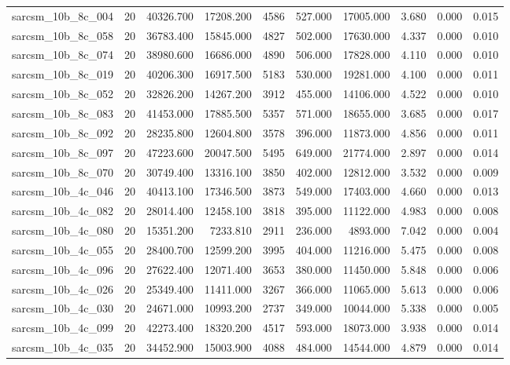 \begin{tabular}{lrrrrrrrrr}
sarcsm\_10b\_8c\_004 & 20 & 40326.700 & 17208.200 & 4586 & 527.000 & 17005.000 & 3.680 & 0.000 & 0.015 \\
sarcsm\_10b\_8c\_058 & 20 & 36783.400 & 15845.000 & 4827 & 502.000 & 17630.000 & 4.337 & 0.000 & 0.010 \\
sarcsm\_10b\_8c\_074 & 20 & 38980.600 & 16686.000 & 4890 & 506.000 & 17828.000 & 4.110 & 0.000 & 0.010 \\
sarcsm\_10b\_8c\_019 & 20 & 40206.300 & 16917.500 & 5183 & 530.000 & 19281.000 & 4.100 & 0.000 & 0.011 \\
sarcsm\_10b\_8c\_052 & 20 & 32826.200 & 14267.200 & 3912 & 455.000 & 14106.000 & 4.522 & 0.000 & 0.010 \\
sarcsm\_10b\_8c\_083 & 20 & 41453.000 & 17885.500 & 5357 & 571.000 & 18655.000 & 3.685 & 0.000 & 0.017 \\
sarcsm\_10b\_8c\_092 & 20 & 28235.800 & 12604.800 & 3578 & 396.000 & 11873.000 & 4.856 & 0.000 & 0.011 \\
sarcsm\_10b\_8c\_097 & 20 & 47223.600 & 20047.500 & 5495 & 649.000 & 21774.000 & 2.897 & 0.000 & 0.014 \\
sarcsm\_10b\_8c\_070 & 20 & 30749.400 & 13316.100 & 3850 & 402.000 & 12812.000 & 3.532 & 0.000 & 0.009 \\
sarcsm\_10b\_4c\_046 & 20 & 40413.100 & 17346.500 & 3873 & 549.000 & 17403.000 & 4.660 & 0.000 & 0.013 \\
sarcsm\_10b\_4c\_082 & 20 & 28014.400 & 12458.100 & 3818 & 395.000 & 11122.000 & 4.983 & 0.000 & 0.008 \\
sarcsm\_10b\_4c\_080 & 20 & 15351.200 & 7233.810 & 2911 & 236.000 & 4893.000 & 7.042 & 0.000 & 0.004 \\
sarcsm\_10b\_4c\_055 & 20 & 28400.700 & 12599.200 & 3995 & 404.000 & 11216.000 & 5.475 & 0.000 & 0.008 \\
sarcsm\_10b\_4c\_096 & 20 & 27622.400 & 12071.400 & 3653 & 380.000 & 11450.000 & 5.848 & 0.000 & 0.006 \\
sarcsm\_10b\_4c\_026 & 20 & 25349.400 & 11411.000 & 3267 & 366.000 & 11065.000 & 5.613 & 0.000 & 0.006 \\
sarcsm\_10b\_4c\_030 & 20 & 24671.000 & 10993.200 & 2737 & 349.000 & 10044.000 & 5.338 & 0.000 & 0.005 \\
sarcsm\_10b\_4c\_099 & 20 & 42273.400 & 18320.200 & 4517 & 593.000 & 18073.000 & 3.938 & 0.000 & 0.014 \\
sarcsm\_10b\_4c\_035 & 20 & 34452.900 & 15003.900 & 4088 & 484.000 & 14544.000 & 4.879 & 0.000 & 0.014 \\

\end{tabular}
